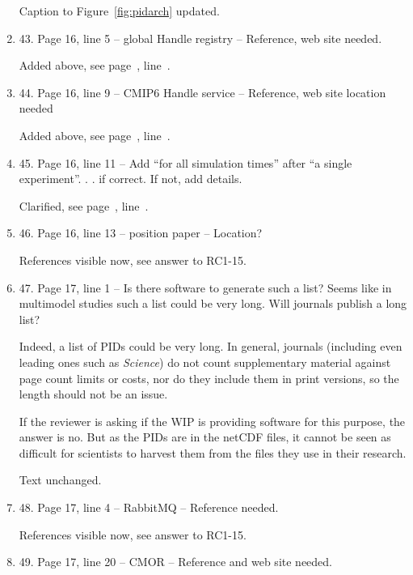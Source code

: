 \documentclass[gmd,manuscript]{copernicus}
\newcommand{\plref}[1]{see page~\pageref{p-#1}, line~\lineref{l-#1}.}
\newenvironment{answer}{\color{blue}}{}
\begin{document}
\begin{enumerate}[label=RC1-\arabic*,leftmargin=*]
  \begin{answer}
    Caption to Figure~\ref{fig:pidarch} updated.
  \end{answer}
\item 43. Page 16, line 5 -- global Handle registry -- Reference, web
  site needed.

  \begin{answer}
    Added above, \plref{RC1-37}
  \end{answer}
\item 44. Page 16, line 9 -- CMIP6 Handle service -- Reference, web site
  location needed

  \begin{answer}
    Added above, \plref{RC1-37}
  \end{answer}
\item 45. Page 16, line 11 -- Add “for all simulation times” after “a
  single experiment”. . . if correct. If not, add details.

  \begin{answer}
    Clarified, \plref{RC1-45}
  \end{answer}
\item 46. Page 16, line 13 -- position paper -- Location?

  \begin{answer}
    References visible now, see answer to RC1-15.
  \end{answer}
\item 47. Page 17, line 1 -- Is there software to generate such a list?
  Seems like in multimodel studies such a list could be very long.
  Will journals publish a long list?

  \begin{answer}
    Indeed, a list of PIDs could be very long. In general, journals
    (including even leading ones such as \emph{Science}) do not count
    supplementary material against page count limits or costs, nor do
    they include them in print versions, so the length should not be
    an issue.

    If the reviewer is asking if the WIP is providing software for
    this purpose, the answer is no. But as the PIDs are in the netCDF
    files, it cannot be seen as difficult for scientists to harvest
    them from the files they use in their research.

    Text unchanged.
  \end{answer}
\item 48. Page 17, line 4 -- RabbitMQ -- Reference needed.

  \begin{answer}
    References visible now, see answer to RC1-15.
  \end{answer}
\item 49. Page 17, line 20 -- CMOR -- Reference and web site needed.


\end{enumerate}
\end{document}
